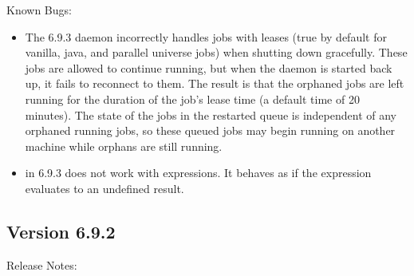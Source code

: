 \noindent Known Bugs:

\begin{itemize}

\item The 6.9.3  daemon incorrectly handles jobs with leases
(true by default for vanilla, java, and parallel universe jobs) when
shutting down gracefully.  These jobs are allowed to continue running,
but when the  daemon is started back up, it fails to reconnect
to them.  The result is that the orphaned jobs are left running for
the duration of the job's lease time (a default time of 20 minutes).
The state of the jobs in the restarted queue is independent of any
orphaned running jobs, so these queued jobs may begin running on another
machine while orphans are still running.

\item {}  in 6.9.3 does not work with expressions.  It
behaves as if the expression evaluates to an undefined result.

\end{itemize}

\subsection*{\label{sec:New-6-9-2}Version 6.9.2}

\noindent Release Notes:

